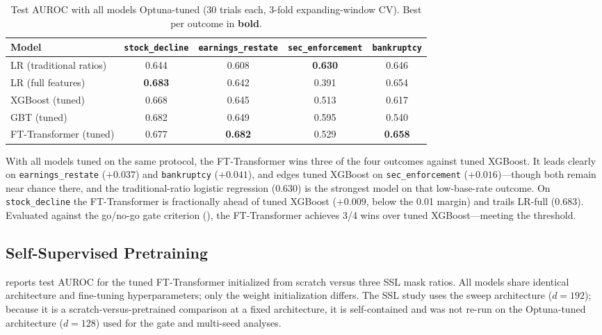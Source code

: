 \begin{table}[ht]
  \centering
  \caption{Test AUROC with all models Optuna-tuned (30 trials each, 3-fold expanding-window CV). Best per outcome in \textbf{bold}.}
  \label{tab:auroc_tuned}
  \small
  \begin{tabular}{@{}lcccc@{}}
    \toprule
    Model & \texttt{stock\_decline} & \texttt{earnings\_restate} & \texttt{sec\_enforcement} & \texttt{bankruptcy} \\
    \midrule
    LR (traditional ratios) & 0.644 & 0.608 & \textbf{0.630} & 0.646 \\
    LR (full features) & \textbf{0.683} & 0.642 & 0.391 & 0.654 \\
    XGBoost (tuned) & 0.668 & 0.645 & 0.513 & 0.617 \\
    GBT (tuned) & 0.682 & 0.649 & 0.595 & 0.540 \\
    FT-Transformer (tuned) & 0.677 & \textbf{0.682} & 0.529 & \textbf{0.658} \\
    \bottomrule
  \end{tabular}
\end{table}

With all models tuned on the same protocol, the FT-Transformer wins three of the four outcomes against tuned XGBoost. It leads clearly on \texttt{earnings\_restate} ($+0.037$) and \texttt{bankruptcy} ($+0.041$), and edges tuned XGBoost on \texttt{sec\_enforcement} ($+0.016$)---though both remain near chance there, and the traditional-ratio logistic regression (0.630) is the strongest model on that low-base-rate outcome. On \texttt{stock\_decline} the FT-Transformer is fractionally ahead of tuned XGBoost ($+0.009$, below the 0.01 margin) and trails LR-full (0.683). Evaluated against the go/no-go gate criterion (), the FT-Transformer achieves 3/4 wins over tuned XGBoost---meeting the threshold.

\subsection{Self-Supervised Pretraining}
\label{sec:results_ssl}

 reports test AUROC for the tuned FT-Transformer initialized from scratch versus three SSL mask ratios. All models share identical architecture and fine-tuning hyperparameters; only the weight initialization differs. The SSL study uses the sweep architecture ($d = 192$); because it is a scratch-versus-pretrained comparison at a fixed architecture, it is self-contained and was not re-run on the Optuna-tuned architecture ($d = 128$) used for the gate and multi-seed analyses.

